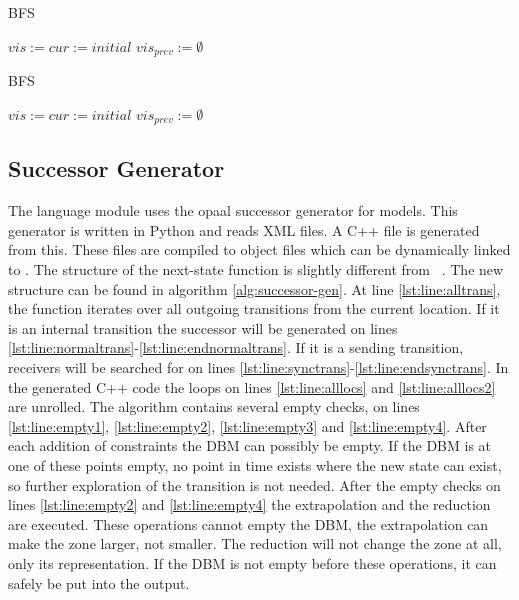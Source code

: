 \begin{algorithm}
\caption{BFS}\label{alg:bfs-check}
\begin{algorithmic}[1]
	\State $vis := cur := initial$
	\State $vis_{prev} := \emptyset$
	\EndWhile
	
\EndProcedure	
\end{algorithmic}
\end{algorithm}

\begin{algorithm}
\caption{BFS}\label{alg:bfs-no-minus}
\begin{algorithmic}[1]
	\State $vis := cur := initial$
	\State $vis_{prev} := \emptyset$
	\EndWhile
	
\EndProcedure	
\end{algorithmic}
\end{algorithm}

\subsection{Successor Generator}
The language module uses the opaal successor generator for \uppaal{} models. This generator is written in Python and reads \uppaal{} XML files. A C++ file is generated from this. These files are compiled to object files which can be dynamically linked to \ltsmin{}. The structure of the next-state function is slightly different from ~\cite{eemcs21972}. The new structure can be found in algorithm \ref{alg:successor-gen}. At line \ref{lst:line:alltrans}, the function iterates over all outgoing transitions from the current location. If it is an internal transition the successor will be generated on lines \ref{lst:line:normaltrans}-\ref{lst:line:endnormaltrans}. If it is a sending transition, receivers will be searched for on lines \ref{lst:line:synctrans}-\ref{lst:line:endsynctrans}. In the generated C++ code the loops on lines \ref{lst:line:alllocs} and \ref{lst:line:alllocs2} are unrolled. The algorithm contains several empty checks, on lines \ref{lst:line:empty1},  \ref{lst:line:empty2}, \ref{lst:line:empty3} and \ref{lst:line:empty4}. After each addition of constraints the DBM can possibly be empty. If the DBM is at one of these points empty, no point in time exists where the new state can exist, so further exploration of the transition is not needed. After the empty checks on lines \ref{lst:line:empty2} and \ref{lst:line:empty4} the extrapolation and the reduction are executed. These operations cannot empty the DBM, the extrapolation can make the zone larger, not smaller. The reduction will not change the zone at all, only its representation. If the DBM is not empty before these operations, it can safely be put into the output.

